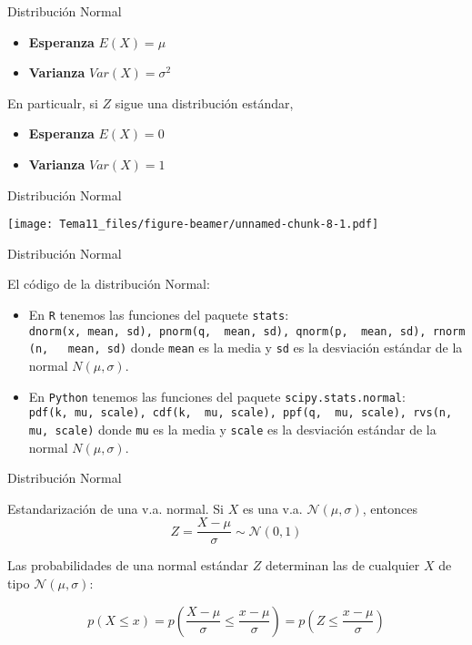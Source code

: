 \documentclass[
  ignorenonframetext,
]{beamer}
\providecommand{\tightlist}{%
  \setlength{\itemsep}{0pt}\setlength{\parskip}{0pt}}
\begin{document}
\begin{frame}{Distribución Normal}
\protect\hypertarget{distribuciuxf3n-normal-1}{}

\begin{itemize}
\tightlist
\item
  \textbf{Esperanza} \(E(X) = \mu\)
\item
  \textbf{Varianza} \(Var(X) = \sigma^2\)
\end{itemize}

En particualr, si \(Z\) sigue una distribución estándar,

\begin{itemize}
\tightlist
\item
  \textbf{Esperanza} \(E(X) = 0\)
\item
  \textbf{Varianza} \(Var(X) = 1\)
\end{itemize}

\end{frame}

\begin{frame}{Distribución Normal}
\protect\hypertarget{distribuciuxf3n-normal-2}{}

\texttt{[image: Tema11\_files/figure-beamer/unnamed-chunk-8-1.pdf]}

\end{frame}

\begin{frame}[fragile]{Distribución Normal}
\protect\hypertarget{distribuciuxf3n-normal-3}{}

El código de la distribución Normal:

\begin{itemize}
\tightlist
\item
  En \texttt{R} tenemos las funciones del paquete \texttt{stats}:
  \texttt{dnorm(x,\ mean,\ sd),\ pnorm(q,\ \ mean,\ sd),\ qnorm(p,\ \ mean,\ sd),\ rnorm(n,\ \ \ mean,\ sd)}
  donde \texttt{mean} es la media y \texttt{sd} es la desviación
  estándar de la normal \(N(\mu, \sigma)\).
\item
  En \texttt{Python} tenemos las funciones del paquete
  \texttt{scipy.stats.normal}:
  \texttt{pdf(k,\ mu,\ scale),\ cdf(k,\ \ mu,\ scale),\ ppf(q,\ \ mu,\ scale),\ rvs(n,\ \ mu,\ scale)}
  donde \texttt{mu} es la media y \texttt{scale} es la desviación
  estándar de la normal \(N(\mu, \sigma)\).
\end{itemize}

\end{frame}

\begin{frame}{Distribución Normal}
\protect\hypertarget{distribuciuxf3n-normal-4}{}

Estandarización de una v.a. normal. Si \(X\) es una v.a.
\(\mathcal{N}(\mu,\sigma)\), entonces
\[Z=\frac{X-\mu}{\sigma}\sim\mathcal{N}(0,1)\]

Las probabilidades de una normal estándar \(Z\) determinan las de
cualquier \(X\) de tipo \(\mathcal{N}(\mu,\sigma)\):

\[p(X\le x)=p\left(\frac{X-\mu}{\sigma}\le\frac{x-\mu}{\sigma}\right)=p\left(Z\le\frac{x-\mu}{\sigma}\right)\]

\end{frame}
\end{document}
